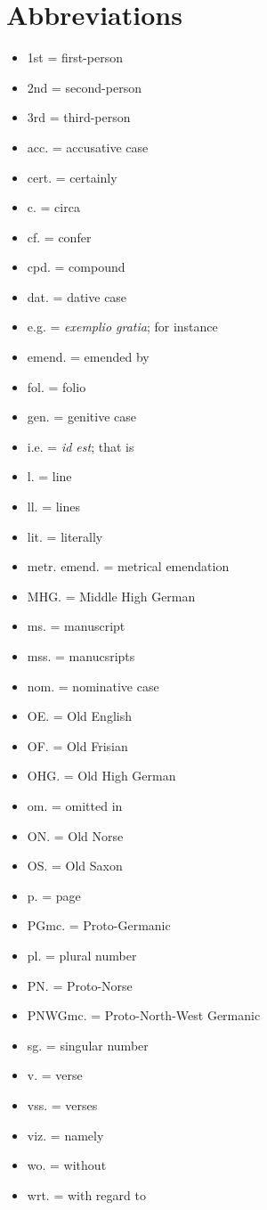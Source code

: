 \thispagestyle{empty}\section{Abbreviations}
  \begin{itemize}
    \item 1st = first-person
    \item 2nd = second-person
    \item 3rd = third-person
    \item acc. = accusative case
    \item cert. = certainly
    \item c. = circa
    \item cf. = confer
    \item cpd. = compound
    \item dat. = dative case
    \item e.g. = \emph{exemplio gratia}; for instance
    \item emend. = emended by
    \item fol. = folio
    \item gen. = genitive case
    \item i.e. = \emph{id est}; that is
    \item l. = line
    \item ll. = lines
    \item lit. = literally
    \item metr. emend. = metrical emendation
    \item MHG. = Middle High German
    \item ms. = manuscript
    \item mss. = manucsripts
    \item nom. = nominative case
    \item OE. = Old English
    \item OF. = Old Frisian
    \item OHG. = Old High German
    \item om. = omitted in
    \item ON. = Old Norse
    \item OS. = Old Saxon
    \item p. = page
    \item PGmc. = Proto-Germanic
    \item pl. = plural number
    \item PN. = Proto-Norse
    \item PNWGmc. = Proto-North-West Germanic
    \item sg. = singular number
    \item v. = verse
    \item vss. = verses
    \item viz. = namely
    \item wo. = without
    \item wrt. = with regard to
  \end{itemize}

